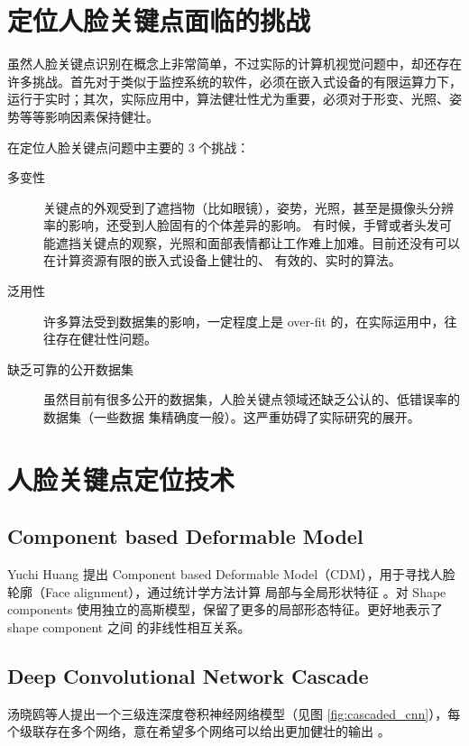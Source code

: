 \documentclass{ctexart}
\begin{document}
\section{定位人脸关键点面临的挑战}

虽然人脸关键点识别在概念上非常简单，不过实际的计算机视觉问题中，却还存在许多挑战。首先对于类似于监控系统的软件，必须在嵌入式设备的有限运算力下，运行于实时；其次，实际应用中，算法健壮性尤为重要，必须对于形变、光照、姿势等等影响因素保持健壮。

在定位人脸关键点问题中主要的 3 个挑战：

\begin{description}
	\item[多变性] 关键点的外观受到了遮挡物（比如眼镜），姿势，光照，甚至是摄像头分辨率的影响，还受到人脸固有的个体差异的影响。
	有时候，手臂或者头发可能遮挡关键点的观察，光照和面部表情都让工作难上加难。目前还没有可以在计算资源有限的嵌入式设备上健壮的、
	有效的、实时的算法。
	\item[泛用性] 许多算法受到数据集的影响，一定程度上是 over-fit 的，在实际运用中，往往存在健壮性问题。
	\item[缺乏可靠的公开数据集] 虽然目前有很多公开的数据集，人脸关键点领域还缺乏公认的、低错误率的数据集（一些数据
	集精确度一般）。这严重妨碍了实际研究的展开。
\end{description}

\section{人脸关键点定位技术}

\subsection{Component based Deformable Model}

Yuchi Huang 提出 Component based Deformable Model（CDM），用于寻找人脸轮廓（Face alignment），通过统计学方法计算
局部与全局形状特征 \cite{cdm}。对 Shape components 使用独立的高斯模型，保留了更多的局部形态特征。更好地表示了 shape component 之间
的非线性相互关系。

\subsection{Deep Convolutional Network Cascade}

汤晓鸥等人提出一个三级连深度卷积神经网络模型（见图 \ref{fig:cascaded_cnn}），每个级联存在多个网络，意在希望多个网络可以给出更加健壮的输出 \cite{cascaded_cnn}。
\end{document}
